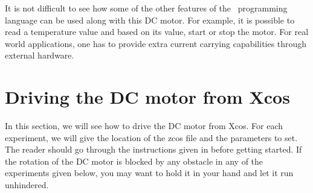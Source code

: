 It is not difficult to see how some of the other features of the
\scilab\ programming language can be used along with this DC motor.
For example, it is possible to read a temperature value and based on
its value, start or stop the motor.  For real world applications, one
has to provide extra current carrying capabilities through external
hardware.  


\section{Driving the DC motor from Xcos}
In this section, we will see how to drive the DC motor from Xcos.  For
each experiment, we will give the location of the zcos file and the
parameters to set.  The reader should go through the instructions
given in  before getting started.  If the
rotation of the DC motor is blocked by any obstacle in any of the
experiments given below, you may want to hold it in your hand and let
it run unhindered.

